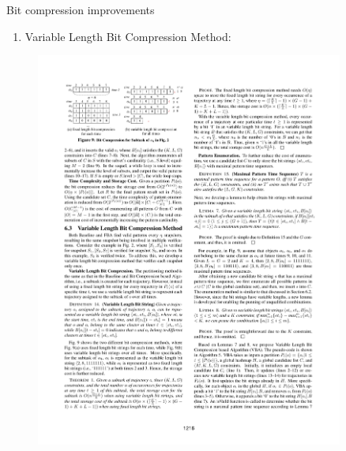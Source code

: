 \documentclass{beamer}
\begin{document}
\begin{frame}{Bit compression improvements}
    \begin{enumerate}[3]
        \item Variable Length Bit Compression Method:
    \end{enumerate}
    \centering 
    \begin{figure}
        \includegraphics[trim=2cm 21.5cm 11.2cm 2cm, clip, width=0.9\textwidth]{figures/Chen_p1216}
    \end{figure}
\end{frame}
\end{document}
